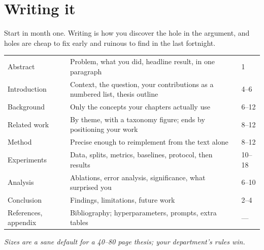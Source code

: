 \documentclass[11pt,a4paper]{article}
\begin{document}
\section{Writing it}

Start in month one. Writing is how you discover the hole in the argument, and
holes are cheap to fix early and ruinous to find in the last fortnight.

\begin{center}
\small
\begin{tabularx}{\textwidth}{L{3.3cm} X L{1.9cm}}
\toprule
{} &  &  \\
\midrule
{}
Abstract & Problem, what you did, headline result, in one paragraph & 1 \\
Introduction & Context, the question, your contributions as a numbered list,
thesis outline & 4--6 \\
Background & Only the concepts your chapters actually use & 6--12 \\
Related work & By theme, with a taxonomy figure; ends by positioning your work
& 8--12 \\
Method & Precise enough to reimplement from the text alone & 8--12 \\
Experiments & Data, splits, metrics, baselines, protocol, then results &
10--18 \\
Analysis & Ablations, error analysis, significance, what surprised you & 6--10 \\
Conclusion & Findings, limitations, future work & 2--4 \\
References, appendix & Bibliography; hyperparameters, prompts, extra tables &
--- \\
\bottomrule
\end{tabularx}
\end{center}

\emph{Sizes are a sane default for a 40--80 page thesis; your department's
rules win.}
\end{document}
